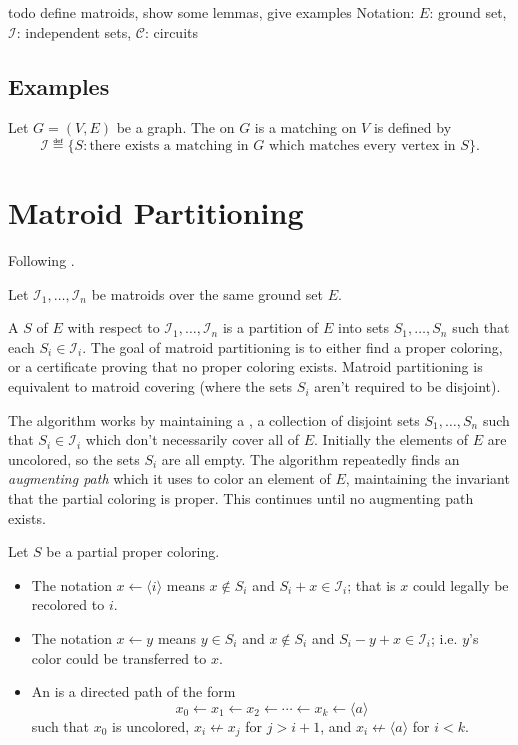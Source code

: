 \documentclass{article}
\newcommand*{\II}[0]{\mathcal{I}}
\newcommand*{\CC}[0]{\mathcal{C}}
\begin{document}
todo define matroids, show some lemmas, give examples
Notation: $E$: ground set, $\II$: independent sets, $\CC$: circuits

\subsection*{Examples}

\begin{example}
  Let $G = (V, E)$ be a graph.  The  on $G$ is a matching on $V$ is defined by
  \[\II \eqdef \{S : \text{there exists a matching in $G$ which matches every vertex in $S$}\}.\]
\end{example}

\section*{Matroid Partitioning}

Following \cite[Chapter 5]{SU1997}.

Let $\II_1, \dots, \II_n$ be matroids over the same ground set $E$.

A  $S$ of $E$ with respect to $\II_1, \dots, \II_n$ is a partition of $E$ into sets $S_1, \dots, S_n$ such that each $S_i \in \II_i$.
The goal of matroid partitioning is to either find a proper coloring, or a certificate proving that no proper coloring exists.
Matroid partitioning is equivalent to matroid covering (where the sets $S_i$ aren't required to be disjoint).

The algorithm works by maintaining a ,
a collection of disjoint sets $S_1, \dots, S_n$ such that $S_i \in \II_i$ which don't necessarily cover all of $E$.
Initially the elements of $E$ are uncolored, so the sets $S_i$ are all empty.
The algorithm repeatedly finds an \emph{augmenting path}
which it uses to color an element of $E$,
maintaining the invariant that the partial coloring is proper.
This continues until no augmenting path exists.

\begin{definition}
  Let $S$ be a partial proper coloring.
  \begin{itemize}
  \item
    The notation $x \gets \langle i \rangle$ means $x \notin S_i$ and $S_i + x \in \II_i$; that is $x$ could legally be recolored to $i$.
  \item The notation $x \gets y$ means $y \in S_i$ and $x \notin S_i$ and $S_i - y + x \in \II_i$; i.e. $y$'s color could be transferred to $x$.
  \item An  is a directed path of the form
    \[x_0 \gets x_1 \gets x_2 \gets \cdots \gets x_k \gets \langle a \rangle\]
    such that $x_0$ is uncolored, $x_i \not\gets x_j$ for $j > i + 1$, and $x_i \not\gets \langle a \rangle$ for $i < k$.
  \end{itemize}
\end{definition}
\end{document}
